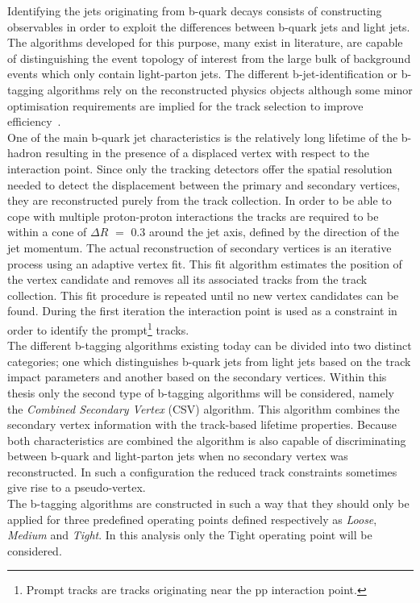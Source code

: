 Identifying the jets originating from b-quark decays consists of constructing observables in order to exploit the differences between b-quark jets and light jets. The algorithms developed for this purpose, many exist in literature, are capable of distinguishing the event topology of interest from the large bulk of background events which only contain light-parton jets.
The different b-jet-identification or b-tagging algorithms rely on the reconstructed physics objects although some minor optimisation requirements are implied for the track selection to improve efficiency~\cite{BJetIdent}.
\\
One of the main b-quark jet characteristics is the relatively long lifetime of the b-hadron resulting in the presence of a displaced vertex with respect to the interaction point. Since only the tracking detectors offer the spatial resolution needed to detect the displacement between the primary and secondary vertices, they are reconstructed purely from the track collection. In order to be able to cope with multiple proton-proton interactions the tracks are required to be within a cone of $\Delta R$ $=$ $0.3$ around the jet axis, defined by the direction of the jet momentum. 
The actual reconstruction of secondary vertices is an iterative process using an adaptive vertex fit. This fit algorithm estimates the position of the vertex candidate and removes all its associated tracks from the track collection. This fit procedure is repeated until no new vertex candidates can be found. During the first iteration the interaction point is used as a constraint in order to identify the prompt\footnote{Prompt tracks are tracks originating near the pp interaction point.} tracks.
\\

The different b-tagging algorithms existing today can be divided into two distinct categories; one which distinguishes b-quark jets from light jets based on the track impact parameters and another based on the secondary vertices. Within this thesis only the second type of b-tagging algorithms will be considered, namely the \textit{Combined Secondary Vertex} (CSV) algorithm. This algorithm combines the secondary vertex information with the track-based lifetime properties. Because both characteristics are combined the algorithm is also capable of discriminating between b-quark and light-parton jets when no secondary vertex was reconstructed. In such a configuration the reduced track constraints sometimes give rise to a pseudo-vertex.
\\
The b-tagging algorithms are constructed in such a way that they should only be applied for three predefined operating points defined respectively as \textit{Loose}, \textit{Medium} and \textit{Tight}. In this analysis only the Tight operating point will be considered. %

